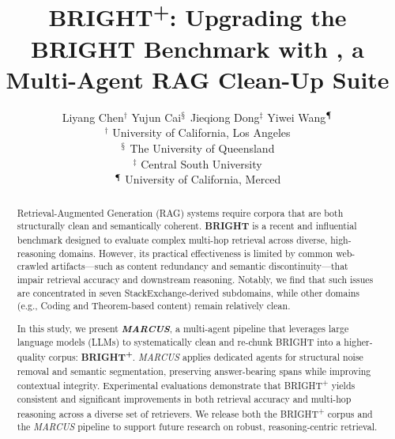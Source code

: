 \documentclass[11pt]{article}
\title{BRIGHT\textsuperscript{+}: Upgrading the BRIGHT Benchmark with \mymethod{}, a Multi-Agent RAG Clean-Up Suite}
\author{
Liyang Chen$^{\dagger}$ \quad 
Yujun Cai$^{\mathsection}$ \quad 
Jieqiong Dong$^{\ddagger}$ \quad 
Yiwei Wang$^{\mathparagraph}$ \\
$^\dagger$ University of California, Los Angeles \\
$^\mathsection$ The University of Queensland \\
$^\ddagger$ Central South University \\
$^\mathparagraph$ University of California, Merced \\
}
\date{}
\newcommand{\mymethod}{\emph{MARCUS}}
\begin{document}
\maketitle
\begin{abstract}
Retrieval-Augmented Generation (RAG) systems require corpora that are both structurally clean and semantically coherent. \textbf{BRIGHT} is a recent and influential benchmark designed to evaluate complex multi-hop retrieval across diverse, high-reasoning domains. However, its practical effectiveness is limited by common web-crawled artifacts—such as content redundancy and semantic discontinuity—that impair retrieval accuracy and downstream reasoning. Notably, we find that such issues are concentrated in seven StackExchange-derived subdomains, while other domains (e.g., Coding and Theorem-based content) remain relatively clean.

In this study, we present \textbf{\mymethod{}}, a multi-agent pipeline that leverages large language models (LLMs) to systematically clean and re-chunk BRIGHT into a higher-quality corpus: \textbf{BRIGHT\textsuperscript{+}}. \mymethod{} applies dedicated agents for structural noise removal and semantic segmentation, preserving answer-bearing spans while improving contextual integrity. Experimental evaluations demonstrate that BRIGHT\textsuperscript{+} yields consistent and significant improvements in both retrieval accuracy and multi-hop reasoning across a diverse set of retrievers. We release both the BRIGHT\textsuperscript{+} corpus and the \mymethod{} pipeline to support future research on robust, reasoning-centric retrieval.
\end{abstract}





\end{document}
